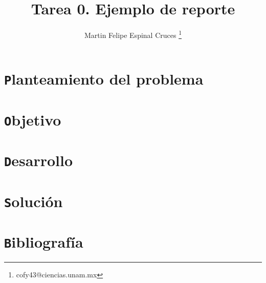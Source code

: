 \documentclass[10pt]{article}
\author{Martin Felipe Espinal Cruces \footnote{cofy43@ciencias.unam.mx}	}
\title{Tarea 0. Ejemplo de reporte}
\begin{document}
\begin{titlepage}
	
	\maketitle
	
	\vspace{.5in}

	\begin{flushleft}
		\section{\texttt Planteamiento del problema}
		\section{\texttt Objetivo}
		\section{\texttt Desarrollo}
		\section{\texttt Solución}
		\section{\texttt Bibliografía}	
	\end{flushleft}
	

\end{titlepage}
\end{document}

